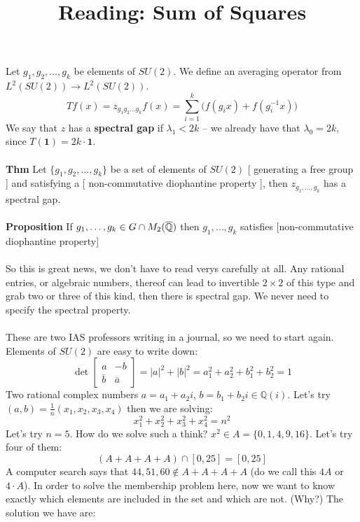 \documentclass[12pt]{article}
\title{Reading: Sum of Squares}
\date{}
\begin{document}
\sffamily

\maketitle

\noindent Let $g_1, g_2, \dots, g_k$ be elements of $SU(2)$.  We define an averaging operator from $L^2(SU(2)) \to L^2(SU(2))$.
$$ Tf(x) = z_{g_1g_2\dots g_k} f(x) = \sum_{i=1}^k \Big( f(g_i x) + f(g_i^{-1}x) \Big) $$
We say that $z$ has a \textbf{spectral gap} if $\lambda_1 < 2k$ -- we already have that $\lambda_0 = 2k$, since $T(\mathbf{1}) = 2k\cdot \mathbf{1}$. \\ \\
\textbf{Thm} Let $\{ g_1, g_2, \dots, g_k\}$ be a set of elements of $SU(2)$ [ generating a free group ] and satisfying a [ non-commutative diophantine property ], then $z_{g_1, \dots, g_k}$ has a spectral gap. \\ \\
\textbf{Proposition} If $g_1, \dots, g_k \in G \cap M_{2 \time 2}(\mathbb{\overline{Q}})$ then $g_1, \dots, g_k$ satisfies [non-commutative diophantine property]  \\ \\
So this is great news, we don't have to read verys carefully at all.  Any rational entries, or algebraic numbers, thereof can lead to invertible $2 \times 2$ of this type and grab two or three of this kind, then there is spectral gap. We never need to specify the spectral property.\\ \\
These are two IAS professors writing in a journal, so we need to start again.  Elements of $SU(2)$ are easy to write down:
$$ \det \left[ \begin{array}{cr} a  & -b \\ \overline{b} & \overline{a} \end{array} \right] = |a|^2 + |b|^2 =
a_1^2 + a_2^2 + b_1^2 + b_2^2 =  1 $$
Two rational complex numbers $a = a_1 + a_2i$, $b = b_1 + b_2i \in \mathbb{Q}(i)$.  Let's try $(a, b) = \frac{1}{n}(x_1, x_2, x_3, x_4)$ then we are solving:
$$ x_1^2 + x_2^2 + x_3^2 + x_4^2 = n^2 $$
Let's try $n = 5$.  How do we solve such a think?  $x^2 \in  A = \{ 0,1,4,9,16 \}$.  Let's try four of them:
$$ ( A + A + A + A ) \cap [0, 25] = [0, 25]$$
A computer search says that $44, 51, 60 \notin A + A + A + A $ (do we call this $4A$ or $4 \cdot A$).  In order to solve the membership problem here, now we want to know exactly which elements are included in the set and which are not. (Why?)  The solution we have are:
\end{document}
